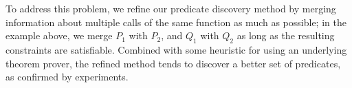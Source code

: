 \begin{enumerate}

 To address this problem,
    we refine our predicate discovery method by merging information about
   multiple calls of the same function as much as possible; in the example
 above, we merge \(P_1\) with \(P_2\), and \(Q_1\) with \(Q_2\) as long
  as the resulting constraints are satisfiable. Combined with some heuristic
  for using an underlying theorem prover, the refined method tends to
  discover a better set of predicates, as confirmed by experiments.




\end{enumerate}

